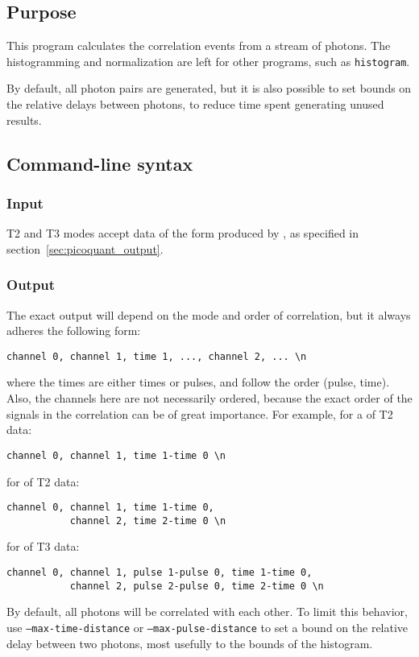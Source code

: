 \subsection{Purpose}
This program calculates the correlation events from a stream of photons. The histogramming and normalization are left for other programs, such as \texttt{histogram}.

By default, all photon pairs are generated, but it is also possible to set bounds on the relative delays between photons, to reduce time spent generating unused results.

\subsection{Command-line syntax}
%

\subsubsection{Input}
T2 and T3 modes accept data of the form produced by , as specified in section~\ref{sec:picoquant_output}.

\subsubsection{Output}
The exact output will depend on the mode and order of correlation, but it always adheres the following form:
\begin{verbatim}
channel 0, channel 1, time 1, ..., channel 2, ... \n
\end{verbatim}
where the times are either times or pulses, and follow the order (pulse, time). Also, the channels here are not necessarily ordered, because the exact order of the signals in the correlation can be of great importance. For example, for a  of T2 data:
\begin{verbatim}
channel 0, channel 1, time 1-time 0 \n
\end{verbatim}
for  of T2 data:
\begin{verbatim}
channel 0, channel 1, time 1-time 0, 
           channel 2, time 2-time 0 \n
\end{verbatim}
for  of T3 data:
\begin{verbatim}
channel 0, channel 1, pulse 1-pulse 0, time 1-time 0,
           channel 2, pulse 2-pulse 0, time 2-time 0 \n
\end{verbatim}

By default, all photons will be correlated with each other. To limit this behavior, use \texttt{--max-time-distance} or \texttt{--max-pulse-distance} to set a bound on the relative delay between two photons, most usefully to the bounds of the histogram.

